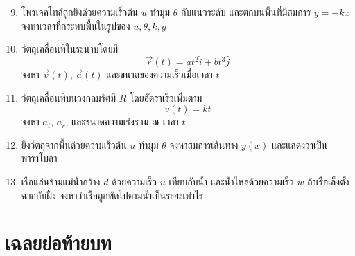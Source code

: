 \begin{enumerate}
    \setcounter{enumi}{8}
    \item โพรเจคไทล์ถูกยิงด้วยความเร็วต้น $u$ ทำมุม $\theta$ กับแนวระดับ และตกบนพื้นที่มีสมการ $y=-kx$ จงหาเวลาที่กระทบพื้นในรูปของ $u,\theta,k,g$

    \item วัตถุเคลื่อนที่ในระนาบโดยมี
    \[
    \vec{r}(t)=at^2\hat{i}+bt^3\hat{j}
    \]
    จงหา $\vec{v}(t)$, $\vec{a}(t)$ และขนาดของความเร็วเมื่อเวลา $t$

    \item วัตถุเคลื่อนที่บนวงกลมรัศมี $R$ โดยอัตราเร็วเพิ่มตาม
    \[
    v(t)=kt
    \]
    จงหา $a_t$, $a_r$, และขนาดความเร่งรวม ณ เวลา $t$

    \item ยิงวัตถุจากพื้นด้วยความเร็วต้น $u$ ทำมุม $\theta$ จงหาสมการเส้นทาง $y(x)$ และแสดงว่าเป็นพาราโบลา

    \item เรือแล่นข้ามแม่น้ำกว้าง $d$ ด้วยความเร็ว $u$ เทียบกับน้ำ และน้ำไหลด้วยความเร็ว $w$ ถ้าเรือเล็งตั้งฉากกับฝั่ง จงหาว่าเรือถูกพัดไปตามน้ำเป็นระยะเท่าไร
\end{enumerate}

\section{เฉลยย่อท้ายบท}

